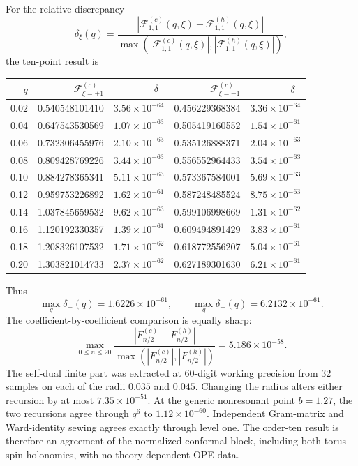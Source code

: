 \documentclass[11pt]{article}
\newcommand{\F}{\mathcal F}
\begin{document}
For the relative discrepancy
\begin{equation}
 \delta_\xi(q)
 =\frac{\left|\F_{1,1}^{(c)}(q,\xi)
                  -\F_{1,1}^{(h)}(q,\xi)\right|}
        {\max\!\left(\left|\F_{1,1}^{(c)}(q,\xi)\right|,
                     \left|\F_{1,1}^{(h)}(q,\xi)\right|\right)},
 \label{eq:torus-c-h-relative-error}
\end{equation}
the ten-point result is
\begin{center}
\scriptsize
\begin{tabular}{@{}rrrrr@{}}
\toprule
\(q\) & \(\F_{\xi=+1}^{(c)}\) & \(\delta_{+}\)
      & \(\F_{\xi=-1}^{(c)}\) & \(\delta_{-}\)\\
\midrule
0.02 & 0.540548101410 & \(3.56\times10^{-64}\)
     & 0.456229368384 & \(3.36\times10^{-64}\)\\
0.04 & 0.647543530569 & \(1.07\times10^{-63}\)
     & 0.505419160552 & \(1.54\times10^{-61}\)\\
0.06 & 0.732306455976 & \(2.10\times10^{-63}\)
     & 0.535126888371 & \(2.04\times10^{-63}\)\\
0.08 & 0.809428769226 & \(3.44\times10^{-63}\)
     & 0.556552964433 & \(3.54\times10^{-63}\)\\
0.10 & 0.884278365341 & \(5.11\times10^{-63}\)
     & 0.573367584001 & \(5.69\times10^{-63}\)\\
0.12 & 0.959753226892 & \(1.62\times10^{-61}\)
     & 0.587248485524 & \(8.75\times10^{-63}\)\\
0.14 & 1.037845659532 & \(9.62\times10^{-63}\)
     & 0.599106998669 & \(1.31\times10^{-62}\)\\
0.16 & 1.120192330357 & \(1.39\times10^{-61}\)
     & 0.609494891429 & \(3.83\times10^{-61}\)\\
0.18 & 1.208326107532 & \(1.71\times10^{-62}\)
     & 0.618772556207 & \(5.04\times10^{-61}\)\\
0.20 & 1.303821014733 & \(2.37\times10^{-62}\)
     & 0.627189301630 & \(6.21\times10^{-61}\)\\
\bottomrule
\end{tabular}
\end{center}
Thus
\begin{equation}
 \max_q\delta_{+}(q)=1.6226\times10^{-61},
 \qquad
 \max_q\delta_{-}(q)=6.2132\times10^{-61}.
 \label{eq:torus-c-h-order-ten-result}
\end{equation}
The coefficient-by-coefficient comparison is equally sharp:
\begin{equation}
 \max_{0\leq n\leq20}
 \frac{|F_{n/2}^{(c)}-F_{n/2}^{(h)}|}
      {\max(|F_{n/2}^{(c)}|,|F_{n/2}^{(h)}|)}
 =5.186\times10^{-58}.
 \label{eq:torus-c-h-coefficient-result}
\end{equation}
The self-dual finite part was extracted at \(60\)-digit working precision
from \(32\) samples on each of the radii \(0.035\) and \(0.045\).  Changing
the radius alters either recursion by at most \(7.35\times10^{-51}\).
At the generic nonresonant point \(b=1.27\), the two recursions agree through
\(q^6\) to \(1.12\times10^{-60}\).  Independent Gram-matrix and Ward-identity
sewing agrees exactly through level one.  The order-ten result is therefore
an agreement of the normalized conformal block, including both torus spin
holonomies, with no theory-dependent OPE data.
\end{document}
